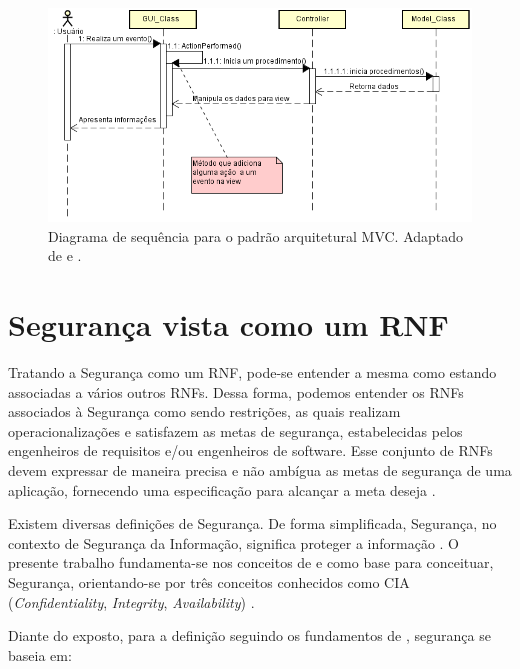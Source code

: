 \begin{figure}[h!]
	\centering
	\includegraphics[keepaspectratio=true,scale=0.8]{figuras/DiagramaDeSequenciaMVC.PNG}
	\caption{Diagrama de sequência para o padrão arquitetural MVC. Adaptado de \cite{durelli2008proposta} e \cite{buschmann1996system}.}
	\label{DiagramaDeSequenciaMVC}
\end{figure}

\pagebreak

\section{Segurança vista como um RNF}
\label{sec:seguranca}

Tratando a Segurança como um RNF, pode-se entender a mesma como estando associadas a vários outros RNFs. Dessa forma, podemos entender os RNFs associados à Segurança como sendo restrições, as quais realizam operacionalizações e satisfazem as metas de segurança, estabelecidas pelos engenheiros de requisitos e/ou engenheiros de software. Esse conjunto de  RNFs devem expressar de maneira precisa e não ambígua as metas de segurança de uma aplicação, fornecendo uma especificação para alcançar a meta deseja \cite{haley2006framework}.  

Existem diversas definições de Segurança. De forma simplificada, Segurança, no contexto de Segurança da Informação, significa proteger a informação \cite{chung2012non}. O presente trabalho fundamenta-se nos conceitos de \cite{chung2012non} e \cite{sullivan2011web} como base para conceituar, Segurança, orientando-se por três conceitos conhecidos como CIA (\textit{Confidentiality}, \textit{Integrity}, \textit{Availability}) . 

Diante do exposto, para a definição seguindo os fundamentos de \cite{chung2012non}, segurança se baseia em: 

